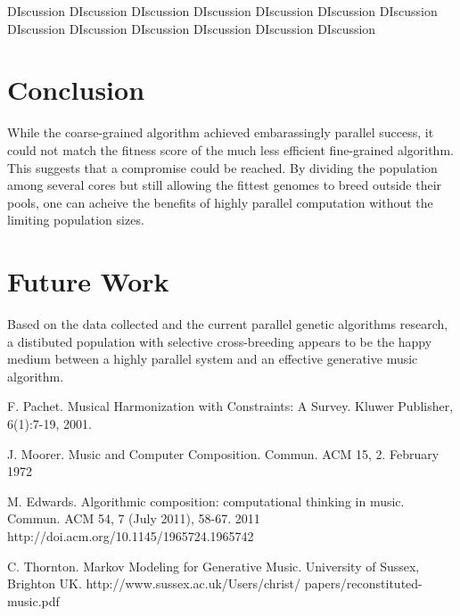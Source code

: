 \documentclass[twoside]{article}
\begin{document}
\begin{multicols}{2}
DIscussion DIscussion DIscussion DIscussion DIscussion DIscussion DIscussion DIscussion DIscussion DIscussion DIscussion DIscussion DIscussion 


\section{Conclusion}

While the coarse-grained algorithm achieved embarassingly parallel success, it could not match the fitness score of the much less efficient fine-grained algorithm. This suggests that a compromise could be reached. By dividing the population among several cores but still allowing the fittest genomes to breed outside their pools, one can acheive the benefits of highly parallel computation without the limiting population sizes.


\section{Future Work}

Based on the data collected and the current parallel genetic algorithms research, a distibuted population with selective cross-breeding appears to be the happy medium between a highly parallel system and an effective generative music algorithm. 



\begin{thebibliography}{99} %
 F. Pachet. Musical Harmonization with Constraints: A Survey. Kluwer Publisher, 6(1):7-19, 2001.

 J. Moorer. Music and Computer Composition. Commun. ACM 15, 2. February 1972

 M. Edwards. Algorithmic composition: computational thinking in music. Commun. ACM 54, 7 (July 2011), 58-67. 2011  http://doi.acm.org/10.1145/1965724.1965742

 C. Thornton. Markov Modeling for Generative Music. University of Sussex, Brighton UK. http://www.sussex.ac.uk/Users/christ/
papers/reconstituted-music.pdf



\end{thebibliography}


\end{multicols}
\end{document}
